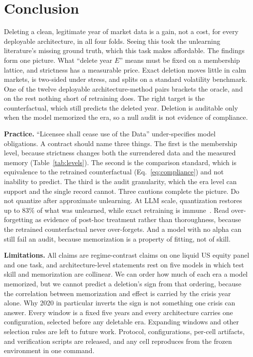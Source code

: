 \section{Conclusion}\label{sec:conclusion}

Deleting a clean, legitimate year of market data is a gain, not a
cost, for every deployable architecture, in all four folds. Seeing
this took the unlearning literature's missing ground truth, which
this task makes affordable. The findings form one picture. What
``delete year $E$'' means must be fixed on a membership lattice,
and strictness has a measurable price. Exact deletion moves little
in calm markets, is two-sided under stress, and splits on a
standard volatility benchmark. One of the twelve deployable
architecture-method pairs brackets the oracle, and on the rest
nothing short of retraining does. The right target is the
counterfactual, which still predicts the deleted year. Deletion is
auditable only when the model memorized the era, so a null audit is
not evidence of compliance.

\textbf{Practice.} ``Licensee shall cease use of the Data''
under-specifies model obligations. A contract should name three
things. The first is the membership level, because strictness
changes both the surrendered data and the measured memory
(Table~\ref{tab:levels}). The second is the comparison standard,
which is equivalence to the retrained counterfactual
(Eq.~\ref{eq:compliance}) and not inability to predict. The third
is the audit granularity, which the era level can support and the
single record cannot. Three cautions complete the picture. Do not
quantize after approximate unlearning. At LLM scale, quantization
restores up to $83\%$ of what was unlearned, while exact retraining
is immune~\cite{zhang2025quantfail}. Read over-forgetting as
evidence of post-hoc treatment rather than thoroughness, because
the retrained counterfactual never over-forgets. And a model with
no alpha can still fail an audit, because memorization is a
property of fitting, not of skill.

\textbf{Limitations.} All claims are regime-contrast claims on one
liquid US equity panel and one task, and architecture-level
statements rest on five models in which test skill and memorization
are collinear. We can order how much of each era a model memorized,
but we cannot predict a deletion's sign from that ordering, because
the correlation between memorization and effect is carried by the
crisis year alone. Why 2020 in particular inverts the sign is not
something one crisis can answer. Every window is a fixed five years
and every architecture carries one configuration, selected before
any deletable era. Expanding windows and other selection rules are
left to future work. Protocol, configurations, per-cell artifacts,
and verification scripts are released, and any cell reproduces from
the frozen environment in one command.
